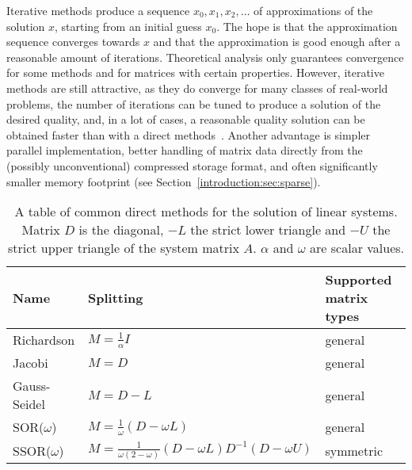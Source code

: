 Iterative methods produce a sequence $x_0, x_1, x_2, \ldots$ of approximations
of the solution $x$, starting from an initial guess $x_0$. The hope is that
the approximation sequence converges towards $x$ and that the approximation is
good enough after a reasonable amount of iterations. Theoretical analysis only
guarantees convergence for some methods and for matrices with certain
properties. However, iterative methods are still attractive, as they do converge
for many classes of real-world problems, the number of iterations can be tuned
to produce a solution of the desired quality, and, in a lot of cases, a
reasonable quality solution can be obtained faster than with a direct
methods~\cite{saad}.  Another advantage is simpler parallel implementation,
better handling of matrix data directly from the (possibly unconventional)
compressed storage format, and often significantly smaller memory footprint (see
Section~\ref{introduction:sec:sparse}).

\begin{table}
\begin{center}
\begin{tabular}{lll}
Name & Splitting & Supported matrix types \\
\midrule
Richardson & 
    $M = \frac{1}{\alpha}I$ &
    general \\[1em]
Jacobi &
    $M = D$ &
    general \\[1em]
Gauss-Seidel &
    $M = D - L$ &
general \\[1em]
SOR($\omega$) &
    $M = \frac{1}{\omega}(D - \omega L)$ &
general \\[1em]
SSOR($\omega$) &
    $M = \frac{1}{\omega(2 - \omega)}(D - \omega L)D^{-1}(D - \omega U)$ &
symmetric \\[1em]
\end{tabular}
\end{center}
\caption{A table of common direct methods for the solution of linear systems.
Matrix $D$ is the diagonal, $-L$ the strict lower triangle and $-U$ the strict
upper triangle of the system matrix $A$. $\alpha$ and $\omega$ are scalar
values.}
\label{introduction:tab:relaxation-methods}
\end{table}

